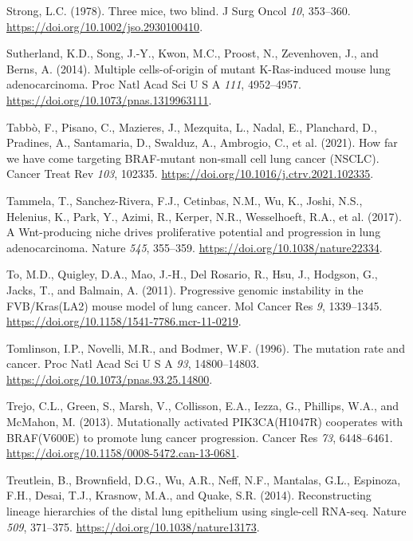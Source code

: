 \begin{CSLReferences}{0}{0}
\leavevmode{}%
Strong, L.C. (1978). Three mice, two blind. J Surg Oncol \emph{10}, 353--360. \url{https://doi.org/10.1002/jso.2930100410}.

\leavevmode{}%
Sutherland, K.D., Song, J.-Y., Kwon, M.C., Proost, N., Zevenhoven, J., and Berns, A. (2014). Multiple cells-of-origin of mutant K-Ras-induced mouse lung adenocarcinoma. Proc Natl Acad Sci U S A \emph{111}, 4952--4957. \url{https://doi.org/10.1073/pnas.1319963111}.

\leavevmode{}%
Tabbò, F., Pisano, C., Mazieres, J., Mezquita, L., Nadal, E., Planchard, D., Pradines, A., Santamaria, D., Swalduz, A., Ambrogio, C., et al. (2021). How far we have come targeting BRAF-mutant non-small cell lung cancer (NSCLC). Cancer Treat Rev \emph{103}, 102335. \url{https://doi.org/10.1016/j.ctrv.2021.102335}.

\leavevmode{}%
Tammela, T., Sanchez-Rivera, F.J., Cetinbas, N.M., Wu, K., Joshi, N.S., Helenius, K., Park, Y., Azimi, R., Kerper, N.R., Wesselhoeft, R.A., et al. (2017). A Wnt-producing niche drives proliferative potential and progression in lung adenocarcinoma. Nature \emph{545}, 355--359. \url{https://doi.org/10.1038/nature22334}.

\leavevmode{}%
To, M.D., Quigley, D.A., Mao, J.-H., Del Rosario, R., Hsu, J., Hodgson, G., Jacks, T., and Balmain, A. (2011). Progressive genomic instability in the FVB/Kras(LA2) mouse model of lung cancer. Mol Cancer Res \emph{9}, 1339--1345. \url{https://doi.org/10.1158/1541-7786.mcr-11-0219}.

\leavevmode{}%
Tomlinson, I.P., Novelli, M.R., and Bodmer, W.F. (1996). The mutation rate and cancer. Proc Natl Acad Sci U S A \emph{93}, 14800--14803. \url{https://doi.org/10.1073/pnas.93.25.14800}.

\leavevmode{}%
Trejo, C.L., Green, S., Marsh, V., Collisson, E.A., Iezza, G., Phillips, W.A., and McMahon, M. (2013). Mutationally activated PIK3CA(H1047R) cooperates with BRAF(V600E) to promote lung cancer progression. Cancer Res \emph{73}, 6448--6461. \url{https://doi.org/10.1158/0008-5472.can-13-0681}.

\leavevmode{}%
Treutlein, B., Brownfield, D.G., Wu, A.R., Neff, N.F., Mantalas, G.L., Espinoza, F.H., Desai, T.J., Krasnow, M.A., and Quake, S.R. (2014). Reconstructing lineage hierarchies of the distal lung epithelium using single-cell RNA-seq. Nature \emph{509}, 371--375. \url{https://doi.org/10.1038/nature13173}.


\end{CSLReferences}
